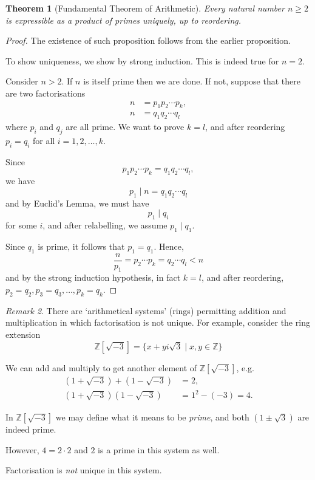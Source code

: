 \documentclass{article}
\newtheorem{theorem}{Theorem}[section]
\theoremstyle{definition}
\theoremstyle{remark}
\newtheorem{remark}[theorem]{Remark}
\newcommand{\pqty}[1]{\left(#1\right)}
\newcommand{\bqty}[1]{\left[#1\right]}
\newcommand{\set}[2]{\{#1\mid #2\}}
\newcommand{\divides}{\mid}
\newcommand{\ZZ}{\mathbb{Z}}
\begin{document}
\begin{theorem}[Fundamental Theorem of Arithmetic]
    Every natural number \(n \geq 2\) is expressible as a product of primes uniquely, up to reordering. 
\end{theorem}

\begin{proof}
    The existence of such proposition follows from the earlier proposition.

    To show uniqueness, we show by strong induction. This is indeed true for \(n = 2\).

    Consider \(n > 2\). If \(n\) is itself prime then we are done. If not, suppose that there are two factorisations
    \begin{align*}
        n &= p_1 p_2 \cdots p_k,\\
        n &= q_1 q_2 \cdots q_l
    \end{align*}
    where \(p_i\) and \(q_j\) are all prime. We want to prove \(k = l\), and after reordering \(p_i = q_i\) for all \(i = 1, 2, \ldots, k\).

    Since
    \[
        p_1 p_2 \cdots p_k = q_1 q_2 \cdots q_l,
    \]
    we have
    \[
        p_1 \divides n = q_1 q_2 \cdots q_l
    \]
    and by Euclid's Lemma, we must have
    \[
        p_1 \divides q_i
    \]
    for some \(i\), and after relabelling, we assume \(p_1 \divides q_1\).

    Since \(q_1\) is prime, it follows that \(p_1 = q_1\). Hence,
    \[
        \frac{n}{p_1} = p_2 \cdots p_k = q_2 \cdots q_l < n
    \]
    and by the strong induction hypothesis, in fact \(k = l\), and after reordering, \(p_2 = q_2, p_3 = q_3, \ldots, p_k = q_k\).
\end{proof}

\begin{remark}
    There are `arithmetical systems' (rings) permitting addition and multiplication in which factorisation is not unique. For example, consider the ring extension
    \[
        \ZZ\bqty{\sqrt{-3}} = \set{x + y i \sqrt{3}}{x, y \in \ZZ}
    \]

    We can add and multiply to get another element of \(\ZZ\bqty{\sqrt{-3}}\), e.g.
    \begin{align*}
        \pqty{1 + \sqrt{-3}} + \pqty{1 - \sqrt{-3}} &= 2,\\
        \pqty{1 + \sqrt{-3}} \pqty{1 - \sqrt{-3}} &= 1^2 - \pqty{-3} = 4.
    \end{align*}

    In \(\ZZ\bqty{\sqrt{-3}}\) we may define what it means to be \emph{prime}, and both \(\pqty{1 \pm \sqrt{3}}\) are indeed prime.

    However, \(4 = 2 \cdot 2\) and \(2\) is a prime in this system as well.

    Factorisation is \emph{not} unique in this system.
\end{remark}
\end{document}
